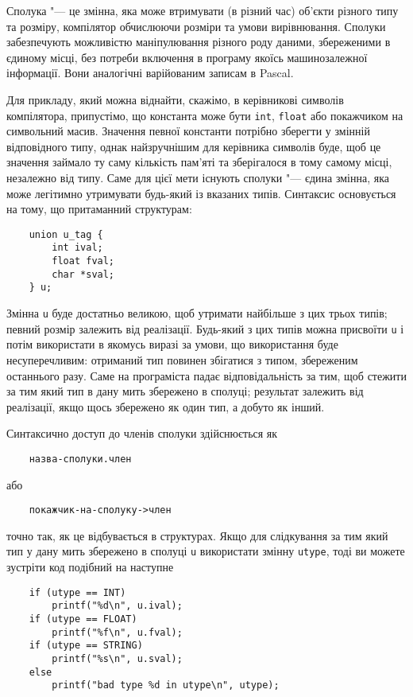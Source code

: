 \documentclass[a4paper,12pt]{book}
\begin{document}
  Сполука "--- це змінна, яка може втримувати (в різний час) об'єкти різного типу та
  розміру, компілятор обчислюючи розміри та умови вирівнювання. Сполуки забезпечують
  можливістю маніпулювання різного роду даними, збереженими в єдиному місці, без потреби
  включення в програму якоїсь машинозалежної інформації. Вони аналогічні варійованим
  записам в Pascal.

  Для прикладу, який можна віднайти, скажімо, в керівникові символів компілятора,
  припустімо, що константа може бути \texttt{int}, \texttt{float} або покажчиком на
  символьний масив. Значення певної константи потрібно зберегти у змінній відповідного
  типу, однак найзручнішим для керівника символів буде, щоб це значення займало ту саму
  кількість пам'яті та зберігалося в тому самому місці, незалежно від типу. Саме для цієї
  мети існують сполуки "--- єдина змінна, яка може легітимно утримувати будь-який із
  вказаних типів. Синтаксис основується на тому, що притаманний структурам:
  \begin{verbatim}
    union u_tag {
        int ival;
        float fval;
        char *sval;
    } u;
  \end{verbatim}

  Змінна \texttt{u} буде достатньо великою, щоб утримати найбільше з цих трьох типів;
  певний розмір залежить від реалізації. Будь-який з цих типів можна присвоїти \texttt{u}
  і потім використати в якомусь виразі за умови, що використання буде несуперечливим:
  отриманий тип повинен збігатися з типом, збереженим останнього разу. Саме на програміста
  падає відповідальність за тим, щоб стежити за тим який тип в дану мить збережено в
  сполуці; результат залежить від реалізації, якщо щось збережено як один тип, а добуто як
  інший.

  Синтаксично доступ до членів сполуки здійснюється як
  \begin{verbatim}
    назва-сполуки.член
  \end{verbatim}
  або
  \begin{verbatim}
    покажчик-на-сполуку->член
  \end{verbatim}
  точно так, як це відбувається в структурах. Якщо для слідкування за тим який тип у дану
  мить збережено в сполуці \texttt{u} використати змінну \texttt{utype}, тоді ви можете
  зустріти код подібний на наступне
  \begin{verbatim}
    if (utype == INT)
        printf("%d\n", u.ival);
    if (utype == FLOAT)
        printf("%f\n", u.fval);
    if (utype == STRING)
        printf("%s\n", u.sval);
    else
        printf("bad type %d in utype\n", utype);
  \end{verbatim}
\end{document}
